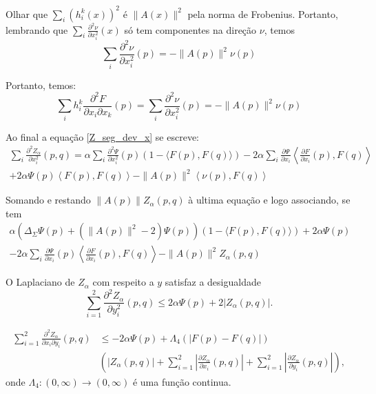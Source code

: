 \begin{demonstracao}
	Olhar que $\sum_i (h_i^k(x))^2$ é $\| A(x) \|^2$ pela norma de Frobenius. Portanto, lembrando que $\sum_i \frac{\partial^2 \nu}{\partial x_i^2}(x)$ só tem componentes na direção $\nu$, temos
	\begin{equation*}
		\sum_i \frac{\partial^2 \nu}{\partial x_i^2}(p) = - \| A(p) \|^2 \nu(p)
	\end{equation*}
	
	Portanto, temos:
	\begin{equation*}
		\sum_i h_i^k \frac{\partial^2 F}{\partial x_i \partial x_k}(p) = \sum_i \frac{\partial^2 \nu}{\partial x_i^2}(p) = - \| A(p) \|^2 \nu(p)
	\end{equation*}
	
	Ao final a equação \ref{Z_seg_dev_x} se escreve:
	\begin{multline*}
		\sum_i \frac{\partial^2 Z_{\alpha}}{\partial x_i^2}(p,q) = \alpha \sum_i \frac{\partial^2 \Psi}{\partial x_i^2}(p)(1 - \langle F(p), F(q) \rangle) -2 \alpha \sum_i \frac{\partial \Psi}{\partial x_i} \left\langle \frac{\partial F}{\partial x_i}(p), F(q) \right\rangle\\
		+ 2 \alpha \Psi(p) \left\langle F(p), F(q) \right\rangle - \| A(p) \|^2 \left\langle \nu(p), F(q) \right\rangle
	\end{multline*}
	
	Somando e restando $\|A(p)\| Z_{\alpha}(p,q)$ à ultima equação e logo associando, se tem
	\begin{multline*}
		\alpha \left( \Delta_{\Sigma} \Psi(p) + (\|A(p)\|^2 - 2) \Psi(p) \right) (1 - \langle F(p), F(q) \rangle) + 2 \alpha \Psi(p)\\
		 - 2 \alpha \sum_i \frac{\partial \Psi}{\partial x_i}(p) \left\langle \frac{\partial F}{\partial x_i}(p), F(q) \right\rangle - \|A(p)\|^2 Z_{\alpha}(p,q)
	\end{multline*}
\end{demonstracao}

\begin{lema}
	O Laplaciano de $Z_{\alpha}$ com respeito a $y$ satisfaz a desigualdade
	\begin{equation*}
		\sum_{i=1}^{2} \frac{\partial^2 Z_{\alpha}}{\partial y_i^2} (p,q) \leq 2 \alpha \Psi(p) + 2 |Z_{\alpha}(p,q)|.
	\end{equation*}
\end{lema}

\begin{lema}
	\begin{equation*}
		\begin{split}
		\sum_{i=1}^{2} \frac{\partial^2 Z_{\alpha}}{\partial x_i \partial y_i} (p,q) &\leq -2 \alpha \Psi(p) + \Lambda_4 (|F(p) - F(q)|)\\
		& \left( |Z_{\alpha}(p,q)| + \sum_{i=1}^{2} \left| \frac{\partial Z_{\alpha}}{\partial x_i} (p,q) \right| + \sum_{i=1}^{2} \left| \frac{\partial Z_{\alpha}}{\partial y_i} (p,q) \right| \right),
		\end{split}		
	\end{equation*}
	onde $\Lambda_4: (0,\infty) \rightarrow (0,\infty)$ é uma função continua.
\end{lema}

